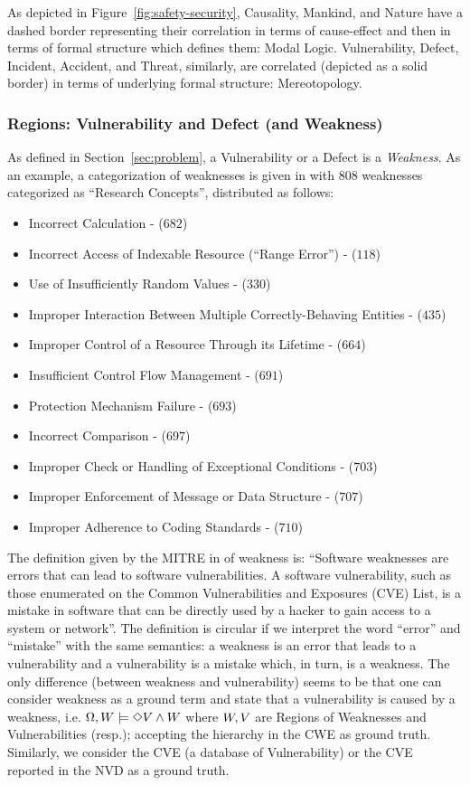 As depicted in Figure~\ref{fig:safety-security}, Causality, Mankind, and Nature
have a dashed border representing their correlation in terms of cause-effect
and then in terms of formal structure which defines them: Modal Logic.
Vulnerability, Defect, Incident, Accident, and Threat, similarly, 
are correlated (depicted as a solid border) in terms of underlying 
formal structure: Mereotopology.

\subsubsection{Regions: Vulnerability and Defect (and Weakness)}\label{sec:vulnerabilitydefect}
As defined in Section~\ref{sec:problem}, a Vulnerability or a Defect is a
\emph{Weakness}.  As an example, a categorization of weaknesses is given
in\autocite{MITRE2020CWEresearch} with 808 weaknesses categorized as ``Research
Concepts'', distributed as follows:
\begin{itemize}[noitemsep]
	\item Incorrect Calculation - ($682$)
	\item Incorrect Access of Indexable Resource (``Range Error'') - ($118$)
	\item Use of Insufficiently Random Values - ($330$)
	\item Improper Interaction Between Multiple Correctly-Behaving Entities - ($435$)
	\item Improper Control of a Resource Through its Lifetime - ($664$)
	\item Insufficient Control Flow Management - ($691$)
	\item Protection Mechanism Failure - ($693$)
	\item Incorrect Comparison - ($697$)
	\item Improper Check or Handling of Exceptional Conditions - ($703$)
	\item Improper Enforcement of Message or Data Structure - ($707$)
	\item Improper Adherence to Coding Standards - ($710$)
\end{itemize}

The definition given by the MITRE in\autocite{MITRE2020CWEweakness} of
weakness is: ``Software weaknesses are errors that can lead to software
vulnerabilities. A software vulnerability, such as those enumerated on the
Common Vulnerabilities and Exposures (CVE) List, is a mistake in software that
can be directly used by a hacker to gain access to a system or network''.
The definition is circular if we interpret the word ``error'' and
``mistake'' with the same semantics: a weakness is an error that leads to a
vulnerability and a vulnerability is a mistake which, in turn, is a weakness.
The only difference (between weakness and vulnerability) seems to be
that one can consider weakness as a ground term and state that a
vulnerability is caused by a weakness, i.e. 
$\Omega,W\models\Diamond V\wedge W$ where
$W,V$ are Regions of Weaknesses and Vulnerabilities (resp.);
accepting the hierarchy in the CWE\autocite{CWE} as ground truth. 
Similarly, we consider the CVE\autocite{CVE} (a database of Vulnerability) 
or the CVE reported in the NVD as a ground truth. 

